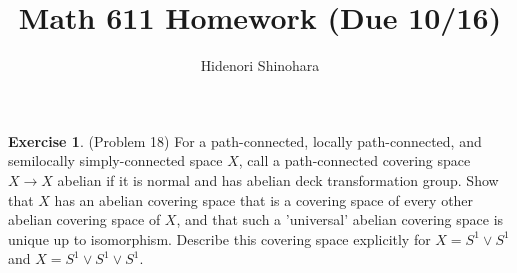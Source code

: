 \documentclass[12pt, psamsfonts]{amsart}
\theoremstyle{definition}
\newtheorem*{exer}{Exercise}
\theoremstyle{remark}
\numberwithin{equation}{section}
\begin{document}
\title{Math 611 Homework (Due 10/16)}
\author{Hidenori Shinohara}
\maketitle

\begin{exer}{(Problem 18)}
  For a path-connected, locally path-connected, and semilocally simply-connected space $X$, call a path-connected covering space $X \rightarrow X$ abelian if it is normal and has abelian deck transformation group.
  Show that $X$ has an abelian covering space that is a covering space of every other abelian covering space of $X$, and that such a 'universal' abelian covering space is unique up to isomorphism.
  Describe this covering space explicitly for $X = S^1 \vee S^1$ and $X = S^1 \vee S^1 \vee S^1$.
\end{exer}
\end{document}
